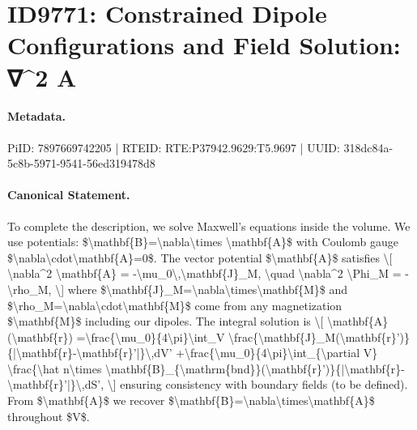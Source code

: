 \section*{ID9771: Constrained Dipole Configurations and Field Solution: ∇\textasciicircum{}2 A}
\paragraph{Metadata.}
PiID: 7897669742205 | RTEID: RTE:P37942.9629:T5.9697 | UUID: 318dc84a-5c8b-5971-9541-56ed319478d8

\paragraph{Canonical Statement.}
To complete the description, we solve Maxwell's equations inside the volume. We use potentials: \$\textbackslash{}mathbf\{B\}=\textbackslash{}nabla\textbackslash{}times \textbackslash{}mathbf\{A\}\$ with Coulomb gauge \$\textbackslash{}nabla\textbackslash{}cdot\textbackslash{}mathbf\{A\}=0\$. The vector potential \$\textbackslash{}mathbf\{A\}\$ satisfies \textbackslash{}[ \textbackslash{}nabla\textasciicircum{}2 \textbackslash{}mathbf\{A\} = -\textbackslash{}mu\_0\textbackslash{},\textbackslash{}mathbf\{J\}\_M, \textbackslash{}quad \textbackslash{}nabla\textasciicircum{}2 \textbackslash{}Phi\_M = -\textbackslash{}rho\_M, \textbackslash{}] where \$\textbackslash{}mathbf\{J\}\_M=\textbackslash{}nabla\textbackslash{}times\textbackslash{}mathbf\{M\}\$ and \$\textbackslash{}rho\_M=\textbackslash{}nabla\textbackslash{}cdot\textbackslash{}mathbf\{M\}\$ come from any magnetization \$\textbackslash{}mathbf\{M\}\$ including our dipoles. The integral solution is \textbackslash{}[ \textbackslash{}mathbf\{A\}(\textbackslash{}mathbf\{r\}) =\textbackslash{}frac\{\textbackslash{}mu\_0\}\{4\textbackslash{}pi\}\textbackslash{}int\_V \textbackslash{}frac\{\textbackslash{}mathbf\{J\}\_M(\textbackslash{}mathbf\{r\}')\}\{|\textbackslash{}mathbf\{r\}-\textbackslash{}mathbf\{r\}'|\}\textbackslash{},dV' +\textbackslash{}frac\{\textbackslash{}mu\_0\}\{4\textbackslash{}pi\}\textbackslash{}int\_\{\textbackslash{}partial V\} \textbackslash{}frac\{\textbackslash{}hat n\textbackslash{}times \textbackslash{}mathbf\{B\}\_\{\textbackslash{}mathrm\{bnd\}\}(\textbackslash{}mathbf\{r\}')\}\{|\textbackslash{}mathbf\{r\}-\textbackslash{}mathbf\{r\}'|\}\textbackslash{},dS', \textbackslash{}] ensuring consistency with boundary fields (to be defined). From \$\textbackslash{}mathbf\{A\}\$ we recover \$\textbackslash{}mathbf\{B\}=\textbackslash{}nabla\textbackslash{}times\textbackslash{}mathbf\{A\}\$ throughout \$V\$.

